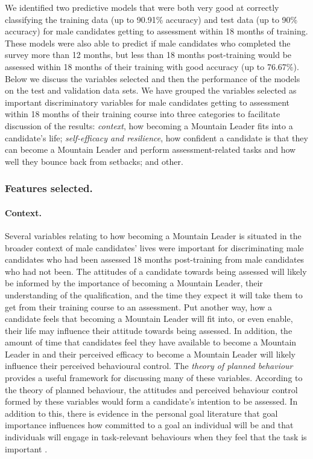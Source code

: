 \documentclass[
  12pt,
  a4paper,
]{book}
\begin{document}
We identified two predictive models that were both very good at correctly classifying the training data (up to 90.91\% accuracy) and test data (up to 90\% accuracy) for male candidates getting to assessment within 18 months of training. These models were also able to predict if male candidates who completed the survey more than 12 months, but less than 18 months post-training would be assessed within 18 months of their training with good accuracy (up to 76.67\%). Below we discuss the variables selected and then the performance of the models on the test and validation data sets. We have grouped the variables selected as important discriminatory variables for male candidates getting to assessment within 18 months of their training course into three categories to facilitate discussion of the results: \emph{context}, how becoming a Mountain Leader fits into a candidate's life; \emph{self-efficacy and resilience}, how confident a candidate is that they can become a Mountain Leader and perform assessment-related tasks and how well they bounce back from setbacks; and other.

\hypertarget{features-selected.}{%
\subsubsection{Features selected.}\label{features-selected.}}

\hypertarget{context}{%
\paragraph{Context.}\label{context}}

Several variables relating to how becoming a Mountain Leader is situated in the broader context of male candidates' lives were important for discriminating male candidates who had been assessed 18 months post-training from male candidates who had not been. The attitudes of a candidate towards being assessed will likely be informed by the importance of becoming a Mountain Leader, their understanding of the qualification, and the time they expect it will take them to get from their training course to an assessment. Put another way, how a candidate feels that becoming a Mountain Leader will fit into, or even enable, their life may influence their attitude towards being assessed. In addition, the amount of time that candidates feel they have available to become a Mountain Leader in and their perceived efficacy to become a Mountain Leader will likely influence their perceived behavioural control. The \emph{theory of planned behaviour} \citep{Ajzen1991, Ajzen1986} provides a useful framework for discussing many of these variables. According to the theory of planned behaviour, the attitudes and perceived behaviour control formed by these variables would form a candidate's intention to be assessed. In addition to this, there is evidence in the personal goal literature that goal importance influences how committed to a goal an individual will be \citep{Gollwitzer1993} and that individuals will engage in task-relevant behaviours when they feel that the task is important \citep[e.g.,][]{Ingledew2005, Yukl1999, Yukl1996}.
\end{document}
